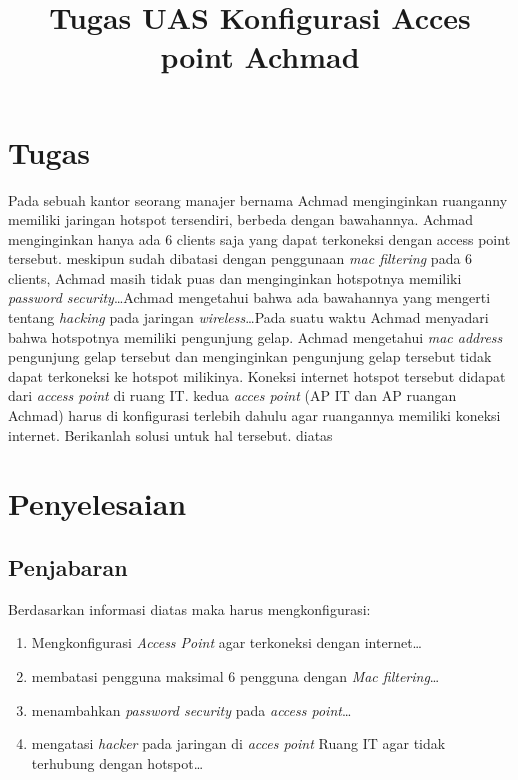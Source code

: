 \documentclass[a4paper, 12pt]{article}
\title{\textbf{Tugas UAS}\linebreak
\textbf{Konfigurasi Acces point Achmad}\linebreak}
\date{}
\begin{document}


\clearpage
\section{Tugas}
Pada sebuah kantor seorang manajer bernama Achmad menginginkan ruanganny memiliki jaringan hotspot tersendiri, berbeda dengan bawahannya. Achmad menginginkan hanya ada 6 clients saja yang dapat terkoneksi dengan access point tersebut. meskipun sudah dibatasi dengan penggunaan \textit{mac filtering} pada 6 clients, Achmad masih tidak puas dan menginginkan hotspotnya memiliki \textit{password security}\dots Achmad mengetahui bahwa ada bawahannya yang mengerti tentang \textit{hacking} pada jaringan \textit{wireless}\dots Pada suatu waktu Achmad menyadari bahwa hotspotnya memiliki pengunjung gelap. Achmad mengetahui \textit{mac address} pengunjung gelap tersebut dan menginginkan pengunjung gelap tersebut tidak dapat terkoneksi ke hotspot milikinya. Koneksi internet hotspot tersebut didapat dari \textit{access point} di ruang IT. kedua \textit{acces point} (AP IT dan AP ruangan Achmad) harus di konfigurasi terlebih dahulu agar ruangannya memiliki koneksi internet. Berikanlah solusi untuk hal tersebut. diatas
\section{Penyelesaian}
\subsection{Penjabaran}
Berdasarkan informasi diatas maka harus mengkonfigurasi:
\begin{enumerate}
  \item Mengkonfigurasi \textit{Access Point} agar terkoneksi dengan internet\dots
  \item membatasi pengguna maksimal 6 pengguna dengan \textit{Mac filtering}\dots
  \item menambahkan \textit{password security} pada \textit{access point}\dots
  \item mengatasi \textit{hacker} pada jaringan di \textit{acces point} Ruang IT agar tidak terhubung dengan hotspot\dots
\end{enumerate}
\end{document}
